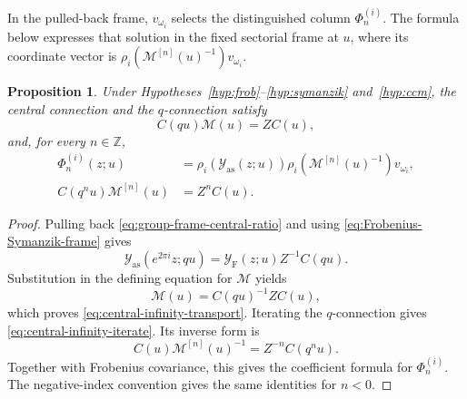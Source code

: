 \documentclass[11pt,leqno]{amsart}
\numberwithin{equation}{section}
\theoremstyle{plain}
\newtheorem{proposition}[theorem]{Proposition}
\theoremstyle{definition}
\theoremstyle{plain}
\theoremstyle{definition}
\theoremstyle{remark}
\begin{document}
In the pulled-back frame, $v_{\omega_i}$ selects the distinguished column $\Phi_n^{(i)}$.  The formula below expresses that solution in the fixed sectorial frame at $u$, where its coordinate vector is $\rho_i(\mathscr M^{[n]}(u)^{-1})v_{\omega_i}$.

\begin{proposition}\label{prop:infinity-frame-transition}
Under Hypotheses~\ref{hyp:frob}--\ref{hyp:symanzik} and~\ref{hyp:ccm}, the central connection and the $q$-connection satisfy
\begin{equation}\label{eq:central-infinity-transport}
 C(qu)\mathscr M(u)=Z C(u),
\end{equation}
and, for every $n\in\mathbb Z$,
\begin{align}
 \Phi_n^{(i)}(z;u)
 &=\rho_i(\mathcal Y_{\mathrm{as}}(z;u))
       \rho_i(\mathscr M^{[n]}(u)^{-1})v_{\omega_i},
       \label{eq:actual-infinity-frame-column}\\
 C(q^nu)\mathscr M^{[n]}(u)&=Z^nC(u).
       \label{eq:central-infinity-iterate}
\end{align}
\end{proposition}
\begin{proof}
Pulling back \eqref{eq:group-frame-central-ratio} and using \eqref{eq:Frobenius-Symanzik-frame} gives
\[
 \mathcal Y_{\mathrm{as}}(e^{2\pi i}z;qu)
 =\mathcal Y_{\mathrm F}(z;u)Z^{-1} C(qu).
\]
Substitution in the defining equation for $\mathscr M$ yields
\[
 \mathscr M(u)=C(qu)^{-1}Z C(u),
\]
which proves \eqref{eq:central-infinity-transport}.  Iterating the $q$-connection gives \eqref{eq:central-infinity-iterate}.  Its inverse form is
\[
 C(u)\mathscr M^{[n]}(u)^{-1}=Z^{-n}C(q^nu).
\]
Together with Frobenius covariance, this gives the coefficient formula for $\Phi_n^{(i)}$.  The negative-index convention gives the same identities for $n<0$.
\end{proof}
\end{document}

